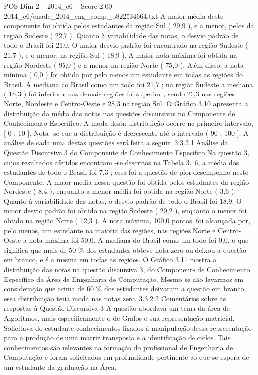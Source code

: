 \begin{textsample}{POS Dim 2 – 2014\_c6 – Score 2.00 – 2014\_c6/enade\_2014\_eng\_comp\_b822534664.txt}
A maior média deste componente foi obtida pelos estudantes da região Sul ( 29,9 ), e a menor, pelos da região Sudeste ( 22,7 ).
Quanto à variabilidade das notas, o desvio padrão de todo o Brasil foi 21,0.
O maior desvio padrão foi encontrado na região Sudeste ( 21,7 ), e o menor, na região Sul ( 18,9 ).
A maior nota máxima foi obtida na região Nordeste ( 95,0 ) e a menor na região Norte ( 75,0 ).
Além disso, a nota mínima ( 0,0 ) foi obtida por pelo menos um estudante em todas as regiões do Brasil.
A mediana do Brasil como um todo foi 21,7 ; na região Sudeste a mediana ( 18,3 ) foi inferior e nas demais regiões foi superior ; sendo 23,3 nas regiões Norte, Nordeste e Centro-Oeste e 28,3 na região Sul.
O Gráfico 3.10 apresenta a distribuição da média das notas nas questões discursivas no Componente de Conhecimento Específico.
A moda desta distribuição ocorre no primeiro intervalo, [ 0 ; 10 ].
Nota -se que a distribuição é decrescente até o intervalo ( 90 ; 100 ].
A análise de cada uma destas questões será feita a seguir. 3.3.2.1 Análise da Questão Discursiva 3 do Componente de Conhecimento Específico Na questão 3, cujos resultados aferidos encontram -se descritos na Tabela 3.16, a média dos estudantes de todo o Brasil foi 7,3 ; essa foi a questão de pior desempenho neste Componente.
A maior média nessa questão foi obtida pelos estudantes da região Nordeste ( 8,4 ), enquanto a menor média foi obtida na região Norte ( 3,6 ).
Quanto à variabilidade das notas, o desvio padrão de todo o Brasil foi 18,9.
O maior desvio padrão foi obtido na região Sudeste ( 20,2 ), enquanto o menor foi obtido na região Norte ( 12,3 ).
A nota máxima, 100,0 pontos, foi alcançada por, pelo menos, um estudante na maioria das regiões, nas regiões Norte e Centro-Oeste a nota máxima foi 50,0.
A mediana do Brasil como um todo foi 0,0, o que significa que mais de 50 \% dos estudantes obteve nota zero ou deixou a questão em branco, e é a mesma em todas as regiões.
O Gráfico 3.11 mostra a distribuição das notas na questão discursiva 3, do Componente de Conhecimento Específico da Área de Engenharia de Computação.
Mesmo se não levarmos em consideração que acima de 60 \% dos estudantes deixaram a questão em branco, essa distribuição teria moda nas notas zero. 3.3.2.2 Comentários sobre as respostas à Questão Discursiva 3 A questão abordava um tema da área de Algoritmos, mais especificamente o de Grafos e sua representação matricial.
Solicitava do estudante conhecimentos ligados à manipulação dessa representação para a produção de uma matriz transposta e a identificação de ciclos.
Tais conhecimentos são relevantes na formação do profissional de Engenharia de Computação e foram solicitados em profundidade pertinente ao que se espera de um estudante da graduação na Área.

\end{textsample}
